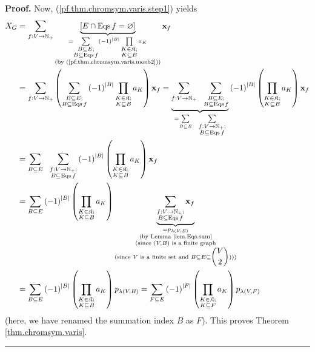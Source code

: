 \documentclass[numbers=enddot,12pt,final,onecolumn,notitlepage]{scrartcl}%
\theoremstyle{definition}
\newenvironment{proof}[1][Proof]{\noindent\textbf{#1.} }{\ \rule{0.5em}{0.5em}}
\newenvironment{verlong}{}{}
\let\sumnonlimits\sum
\let\prodnonlimits\prod
\renewcommand{\sum}{\sumnonlimits\limits}
\renewcommand{\prod}{\prodnonlimits\limits}
\begin{document}
\begin{verlong}
\begin{proof}
Now, (\ref{pf.thm.chromsym.varis.step1}) yields%
\begin{align*}
X_{G}  &  =\sum_{f:V\rightarrow\mathbb{N}_{+}}\underbrace{\left[
E\cap\operatorname*{Eqs}f=\varnothing\right]  }_{\substack{=\sum
_{\substack{B\subseteq E;\\B\subseteq\operatorname*{Eqs}f}}\left(  -1\right)
^{\left\vert B\right\vert }\prod_{\substack{K\in\mathfrak{K};\\K\subseteq
B}}a_{K}\\\text{(by (\ref{pf.thm.chromsym.varis.moeb2}))}}}\mathbf{x}_{f}\\
&  =\sum_{f:V\rightarrow\mathbb{N}_{+}}\left(  \sum_{\substack{B\subseteq
E;\\B\subseteq\operatorname*{Eqs}f}}\left(  -1\right)  ^{\left\vert
B\right\vert }\prod_{\substack{K\in\mathfrak{K};\\K\subseteq B}}a_{K}\right)
\mathbf{x}_{f}=\underbrace{\sum_{f:V\rightarrow\mathbb{N}_{+}}\ \ \sum
_{\substack{B\subseteq E;\\B\subseteq\operatorname*{Eqs}f}}}_{=\sum
_{B\subseteq E}\ \ \sum_{\substack{f:V\rightarrow\mathbb{N}_{+};\\B\subseteq
\operatorname*{Eqs}f}}}\left(  -1\right)  ^{\left\vert B\right\vert }\left(
\prod_{\substack{K\in\mathfrak{K};\\K\subseteq B}}a_{K}\right)  \mathbf{x}%
_{f}\\
&  =\sum_{B\subseteq E}\ \ \sum_{\substack{f:V\rightarrow\mathbb{N}%
_{+};\\B\subseteq\operatorname*{Eqs}f}}\left(  -1\right)  ^{\left\vert
B\right\vert }\left(  \prod_{\substack{K\in\mathfrak{K};\\K\subseteq B}%
}a_{K}\right)  \mathbf{x}_{f}\\
&  =\sum_{B\subseteq E}\left(  -1\right)  ^{\left\vert B\right\vert }\left(
\prod_{\substack{K\in\mathfrak{K};\\K\subseteq B}}a_{K}\right)
\underbrace{\sum_{\substack{f:V\rightarrow\mathbb{N}_{+};\\B\subseteq
\operatorname*{Eqs}f}}\mathbf{x}_{f}}_{\substack{=p_{\lambda\left(
V,B\right)  }\\\text{(by Lemma \ref{lem.Eqs.sum}}\\\text{(since }\left(
V,B\right)  \text{ is a finite graph}\\\text{(since }V\text{ is a finite set
and }B\subseteq E\subseteq\dbinom{V}{2}\text{)))}}}\\
&  =\sum_{B\subseteq E}\left(  -1\right)  ^{\left\vert B\right\vert }\left(
\prod_{\substack{K\in\mathfrak{K};\\K\subseteq B}}a_{K}\right)  p_{\lambda
\left(  V,B\right)  }=\sum_{F\subseteq E}\left(  -1\right)  ^{\left\vert
F\right\vert }\left(  \prod_{\substack{K\in\mathfrak{K};\\K\subseteq F}%
}a_{K}\right)  p_{\lambda\left(  V,F\right)  }%
\end{align*}
(here, we have renamed the summation index $B$ as $F$). This proves Theorem
\ref{thm.chromsym.varis}.
\end{proof}
\end{verlong}
\end{document}
